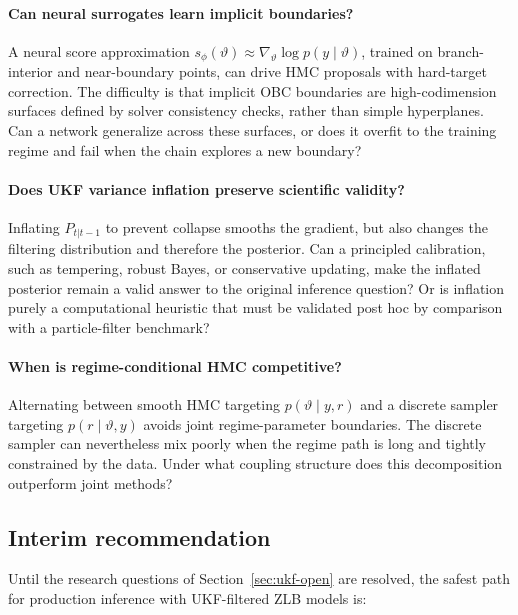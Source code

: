 \documentclass[11pt]{article}
\begin{document}
\paragraph{Can neural surrogates learn implicit boundaries?}
A neural score approximation $s_\phi(\vartheta)\approx\nabla_\vartheta\log
p(y\mid\vartheta)$, trained on branch-interior and near-boundary points, can drive HMC proposals with hard-target correction. The difficulty is that implicit OBC boundaries are high-codimension surfaces defined by solver consistency checks, rather than simple hyperplanes. Can a network generalize across these surfaces, or does it overfit to the training regime and fail when the chain explores a new boundary?

\paragraph{Does UKF variance inflation preserve scientific validity?}
Inflating $P_{t|t-1}$ to prevent collapse smooths the gradient, but also changes the filtering distribution and therefore the posterior. Can a principled calibration, such as tempering, robust Bayes, or conservative updating, make the inflated posterior remain a valid answer to the original inference question? Or is inflation purely a computational heuristic that must be validated post hoc by comparison with a particle-filter benchmark?

\paragraph{When is regime-conditional HMC competitive?}
Alternating between smooth HMC targeting $p(\vartheta\mid y,r)$ and a discrete sampler targeting $p(r\mid\vartheta,y)$ avoids joint regime-parameter boundaries. The discrete sampler can nevertheless mix poorly when the regime path is long and tightly constrained by the data. Under what coupling structure does this decomposition outperform joint methods?

\subsection{Interim recommendation}\label{sec:ukf-recommendation}

Until the research questions of Section~\ref{sec:ukf-open} are resolved, the safest path for production inference with UKF-filtered ZLB models is:
\end{document}
